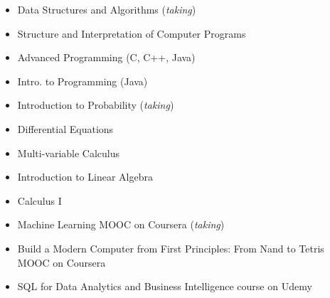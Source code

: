 \documentclass[10pt,a4paper,ragged2e]{altacv}
\begin{document}
\begin{itemize}
    \item Data Structures and Algorithms (\textit{taking})
    \item Structure and Interpretation of Computer Programs
    \item Advanced Programming (C, C++, Java)
    \item Intro. to Programming (Java)
\end{itemize}
\begin{itemize}
    \item Introduction to Probability (\textit{taking})
    \item Differential Equations
    \item Multi-variable Calculus
    \item Introduction to Linear Algebra
    \item Calculus I
\end{itemize}
\begin{itemize}
    \item Machine Learning MOOC on Coursera (\textit{taking})
    \item Build a Modern Computer from First Principles: From Nand to Tetris MOOC on Coursera
    \item SQL for Data Analytics and Business Intelligence course on Udemy
\end{itemize}
\smallskip

\clearpage

\nocite{*}
\end{document}
